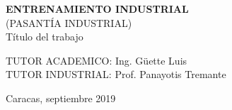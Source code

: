 
\begin{center}
    \textbf{ENTRENAMIENTO INDUSTRIAL}\\
    (PASANTÍA INDUSTRIAL)\\

    \vspace{6cm}
    Título del trabajo
\end{center}    
    \vspace{6cm}
    \hspace{6cm}TUTOR ACADEMICO: Ing. Güette Luis\\
    \hspace{6cm}TUTOR INDUSTRIAL: Prof. Panayotis Tremante\\

    \vspace{5cm}
    \begin{center}
        Caracas, septiembre 2019
    \end{center}
    \thispagestyle{empty} 
    \newpage